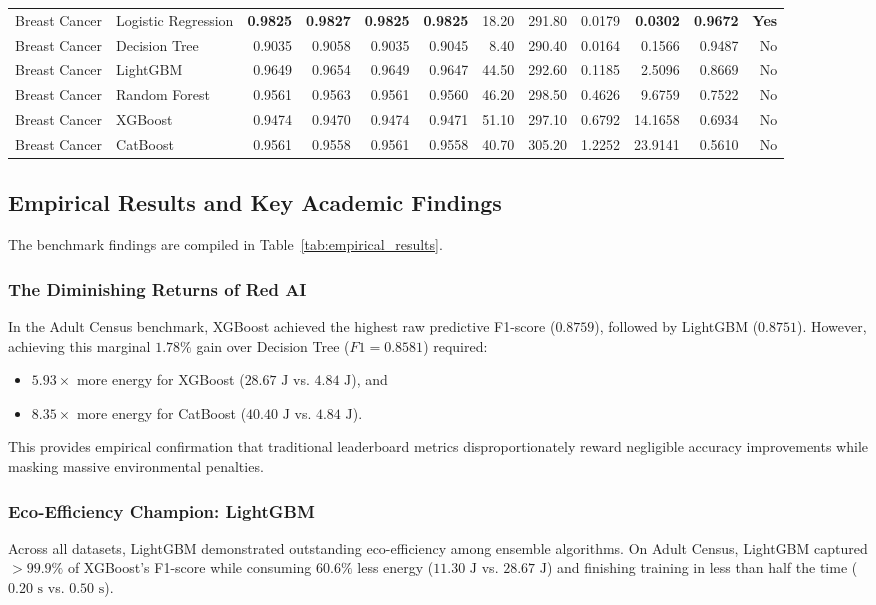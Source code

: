 \documentclass[conference]{IEEEtran}
\begin{document}
\begin{table}[t]
\begin{tabular}{llrrrrrrrrrr}
\midrule
Breast Cancer& Logistic Regression & \textbf{0.9825} & \textbf{0.9827} & \textbf{0.9825} & \textbf{0.9825} & 18.20 & 291.80 & 0.0179 & \textbf{0.0302}  & \textbf{0.9672} & \textbf{Yes} \\
Breast Cancer& Decision Tree       & 0.9035 & 0.9058 & 0.9035 & 0.9045 & 8.40  & 290.40 & 0.0164 & 0.1566  & 0.9487 & No \\
Breast Cancer& LightGBM            & 0.9649 & 0.9654 & 0.9649 & 0.9647 & 44.50 & 292.60 & 0.1185 & 2.5096  & 0.8669 & No \\
Breast Cancer& Random Forest       & 0.9561 & 0.9563 & 0.9561 & 0.9560 & 46.20 & 298.50 & 0.4626 & 9.6759  & 0.7522 & No \\
Breast Cancer& XGBoost             & 0.9474 & 0.9470 & 0.9474 & 0.9471 & 51.10 & 297.10 & 0.6792 & 14.1658 & 0.6934 & No \\
Breast Cancer& CatBoost            & 0.9561 & 0.9558 & 0.9561 & 0.9558 & 40.70 & 305.20 & 1.2252 & 23.9141 & 0.5610 & No \\
\bottomrule
\end{tabular}
\end{table}

\subsection{Empirical Results and Key Academic Findings}
The benchmark findings are compiled in Table~\ref{tab:empirical_results}.

\subsubsection{The Diminishing Returns of Red AI}
In the Adult Census benchmark, XGBoost achieved the highest raw predictive F1-score ($0.8759$), followed by LightGBM ($0.8751$). However, achieving this marginal $1.78\%$ gain over Decision Tree ($F1 = 0.8581$) required:
\begin{itemize}
    \item $5.93\times$ more energy for XGBoost ($28.67\text{ J}$ vs. $4.84\text{ J}$), and
    \item $8.35\times$ more energy for CatBoost ($40.40\text{ J}$ vs. $4.84\text{ J}$).
\end{itemize}
This provides empirical confirmation that traditional leaderboard metrics disproportionately reward negligible accuracy improvements while masking massive environmental penalties.

\subsubsection{Eco-Efficiency Champion: LightGBM}
Across all datasets, LightGBM demonstrated outstanding eco-efficiency among ensemble algorithms. On Adult Census, LightGBM captured $>99.9\%$ of XGBoost's F1-score while consuming $60.6\%$ less energy ($11.30\text{ J}$ vs. $28.67\text{ J}$) and finishing training in less than half the time ($0.20\text{ s}$ vs. $0.50\text{ s}$).
\end{document}
